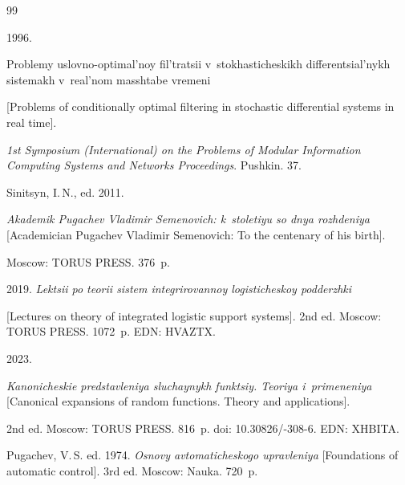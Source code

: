 {{\begin{thebibliography}{99}


 1996.

Problemy uslovno-optimal'noy fil'tratsii v~stokhasticheskikh differentsial'nykh sistemakh v~real'nom masshtabe vremeni 

[Problems of conditionally optimal filtering in stochastic differential systems in real time]. 

\textit{1st Symposium (International) on the Problems of Modular Information Computing Systems and Networks Proceedings}. Pushkin. 37.





Sinitsyn, I.\,N., ed. 2011. 

\textit{Akademik Pugachev Vladimir Semenovich: k~stoletiyu so dnya rozhdeniya} [Academician Pugachev Vladimir Semenovich: To the centenary of his birth]. 

Moscow: TORUS PRESS. 376~p.






 2019. \textit{Lektsii po teorii sistem integrirovannoy logisticheskoy podderzhki} 

 [Lectures on theory of integrated logistic support systems]. 2nd ed. Moscow: TORUS PRESS. 1072~p. EDN: HVAZTX.





 2023.

\textit{Kanonicheskie predstavleniya sluchaynykh funktsiy. Teoriya i~primeneniya} [Canonical expansions of random functions. Theory and applications]. 

2nd ed. Moscow: TORUS PRESS. 816~p. doi: 10.30826\!/-308-6. EDN: XHBITA.





Pugachev, V.\,S. ed. 1974. \textit{Osnovy avtomaticheskogo upravleniya} [Foundations of automatic control]. 3rd ed. Moscow: Nauka. 720~p.





\end{thebibliography}}}
